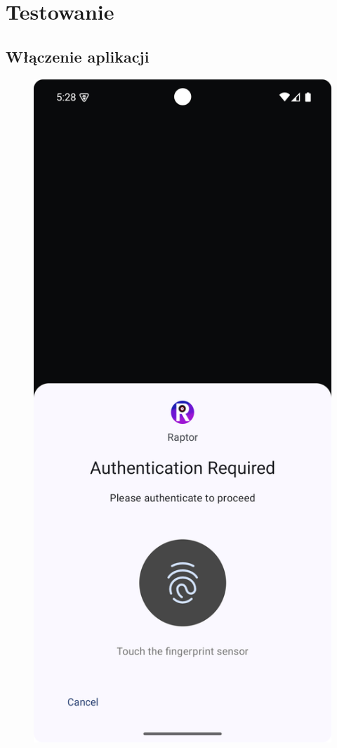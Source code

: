 	\newpage
\section{Testowanie}	%

\subsection{Włączenie aplikacji}
\newpage

\begin{figure}[H]
	\centering
	\includegraphics[width=1\textwidth]{images/usage_fingerprint.png}

\end{figure}
